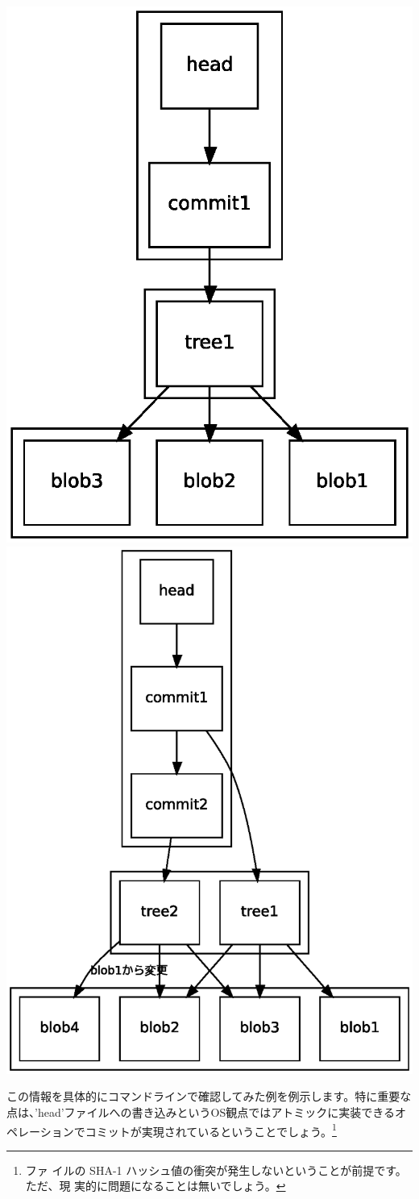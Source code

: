 \documentclass[mingoth,a4paper]{jsarticle}
\begin{document}
\includegraphics[width=0.38\hsize]{image200704/git-filesystem-concept.eps}
\includegraphics[width=0.5\hsize]{image200704/git-filesystem-concept2.eps}

この情報を具体的にコマンドラインで確認してみた例を例示します。特に重要な
点は、'head'ファイルへの書き込みというOS観点ではアトミックに実装できるオ
ペレーションでコミットが実現されているということでしょう。\footnote{ファ
イルの SHA-1 ハッシュ値の衝突が発生しないということが前提です。ただ、現
実的に問題になることは無いでしょう。}
\end{document}
